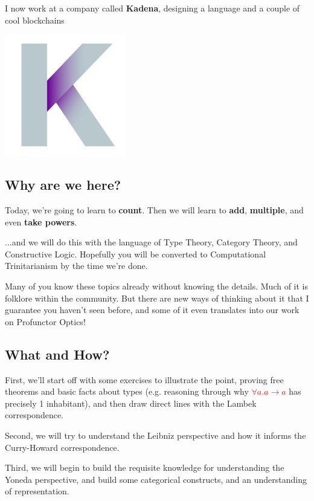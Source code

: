 \documentclass[tikz]{beamer}
\newcommand{\red}[1]{\textcolor{red}{#1}}
\theoremstyle{definition}
\begin{document}
\frame
{ 
	I now work at a company called \textbf{Kadena}, designing a language and a couple of cool blockchains
	\begin{center}
		\includegraphics[scale=0.3]{kadena}
	\end{center}
	
}

\subsection{Why are we here?}

\frame
{ 
	Today, we're going to learn to \textbf{count}. Then we will learn to \textbf{add}, \textbf{multiple}, and even \textbf{take powers}. 
}

\frame
{ 
	...and we will do this with the language of Type Theory, Category Theory, and Constructive Logic. Hopefully you will be converted to Computational Trinitarianism by the time we're done.
}

\frame
{ 
	Many of you know these topics already without knowing the details. Much of it is folklore within the community. But there are new ways of thinking about it that I guarantee you haven't seen before, and some of it even translates into our work on Profunctor Optics! 
}

\subsection{What and How?}

\frame
{ 
	First, we'll start off with some exercises to illustrate the point, proving free theorems and basic facts about types (e.g. reasoning through why \red{$\forall a. a \to a$} has precisely 1 inhabitant), and then draw direct lines with the Lambek correspondence. 
}

\frame
{ 
	Second, we will try to understand the Leibniz perspective and how it informs the Curry-Howard correspondence. 
}

\frame
{ 
	Third, we will begin to build the requisite knowledge for understanding the Yoneda perspective, and build some categorical constructs, and an understanding of representation. 
}
\end{document}
